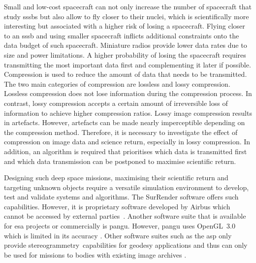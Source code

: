 Small and low-cost spacecraft can not only increase the number of spacecraft that study \glspl{sssb} but also allow to fly closer to their nuclei, which is scientifically more interesting but associated with a higher risk of losing a spacecraft. Flying closer to an \gls{sssb} and using smaller spacecraft inflicts additional constraints onto the data budget of such spacecraft. Miniature radios provide lower data rates due to size and power limitations. A higher probability of losing the spacecraft requires transmitting the most important data first and complementing it later if possible. Compression is used to reduce the amount of data that needs to be transmitted. The two main categories of compression are lossless and lossy compression. Lossless compression does not lose information during the compression process. In contrast, lossy compression accepts a certain amount of irreversible loss of information to achieve higher compression ratios. Lossy image compression results in artefacts. However, artefacts can be made nearly imperceptible depending on the compression method. Therefore, it is necessary to investigate the effect of compression on image data and science return, especially in lossy compression. In addition, an algorithm is required that prioritises which data is transmitted first and which data transmission can be postponed to maximise scientific return.

Designing such deep space missions, maximising their scientific return and targeting unknown objects require a versatile simulation environment to develop, test and validate systems and algorithms. The SurRender software offers such capabilities. However, it is proprietary software developed by Airbus which cannot be accessed by external parties~\cite{Brochard2018ScientificSoftware}. Another software suite that is available for \gls{esa} projects or commercially is \gls{pangu}. However, \gls{pangu} uses OpenGL~3.0 which is limited in its accuracy \cite{Martin2019PlanetaryPANGU}. Other software suites such as the \gls{asp} only provide stereogrammetry~capabilities for geodesy applications and thus can only be used for missions to bodies with existing image archives \cite{Beyer2018TheData}.


